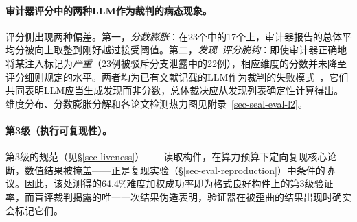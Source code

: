 \paragraph{审计器评分中的两种LLM作为裁判的病态现象。}
评分侧出现两种偏差。第一，\emph{分数膨胀}：在23个\ara{}中的17个上，审计器报告的总体平均分被向上取整到刚好越过接受阈值。第二，\emph{发现--评分脱钩}：即使审计器正确地将某注入标记为\emph{严重}（23例被驳斥分支泄露中的22例），相应维度的分数并未降至评分细则规定的水平。两者均为已有文献记载的LLM作为裁判的失败模式~\citep{zheng2023judging}，它们共同表明LLM应当生成发现而非分数，总体裁决应从发现列表确定性计算得出。维度分布、分数膨胀分解和各论文检测热力图见附录~\ref{sec-seal-eval-l2}。

\paragraph{第3级（执行可复现性）。}
第3级的规范（见\S\ref{sec-liveness}）——读取构件，在算力预算下定向复现核心论断，数值结果被掩盖——正是复现实验（\S\ref{sec-eval-reproduction}）中\ara{}条件的协议。因此，该处测得的64.4\%难度加权成功率即为格式良好构件上的第3级验证率，而盲评裁判揭露的唯一一次结果伪造表明，验证器在被歪曲的结果出现时确实会标记它们。
